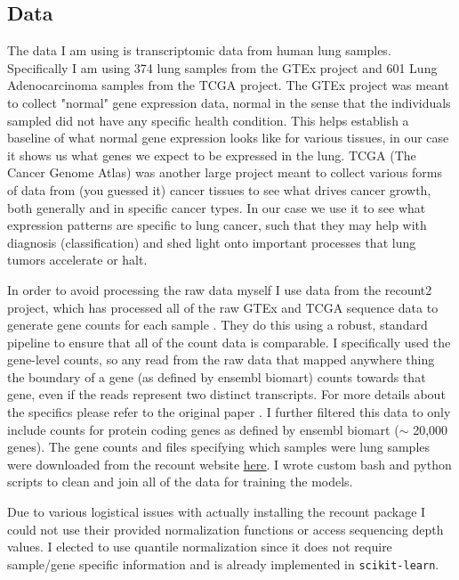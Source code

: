 \subsection{Data}
The data I am using is transcriptomic data from human lung samples.
Specifically I am using 374 lung samples from the GTEx project and 601 Lung Adenocarcinoma samples from the TCGA project.
The GTEx project was meant to collect "normal" gene expression data, normal in the sense that the individuals sampled did not have any specific health condition.
This helps establish a baseline of what normal gene expression looks like for various tissues, in our case it shows us what genes we expect to be expressed in the lung.
TCGA (The Cancer Genome Atlas) was another large project meant to collect various forms of data from (you guessed it) cancer tissues to see what drives cancer growth, both generally and in specific cancer types.
In our case we use it to see what expression patterns are specific to lung cancer, such that they may help with diagnosis (classification) and shed light onto important processes that lung tumors accelerate or halt.

In order to avoid processing the raw data myself I use data from the recount2 project, which has processed all of the raw GTEx and TCGA  sequence data to generate gene counts for each sample \cite{recount2}.
They do this using a robust, standard pipeline to ensure that all of the count data is comparable.
I specifically used the gene-level counts, so any read from the raw data that mapped anywhere thing the boundary of a gene (as defined by ensembl biomart) counts towards that gene, even if the reads represent two distinct transcripts.
For more details about the specifics please refer to the original paper \cite{recount2}.
I further filtered this data to only include counts for protein coding genes as defined by ensembl biomart ($\sim$ 20,000 genes).
The gene counts and files specifying which samples were lung samples were downloaded from the recount website \href{https://jhubiostatistics.shinyapps.io/recount/}{\underline{here}}.
I wrote custom bash and python scripts to clean and join all of the data for training the models.

Due to various logistical issues with actually installing the recount package I could not use their provided normalization functions or access sequencing depth values.
I elected to use quantile normalization since it does not require sample/gene specific information and is already implemented in \verb|scikit-learn|.

